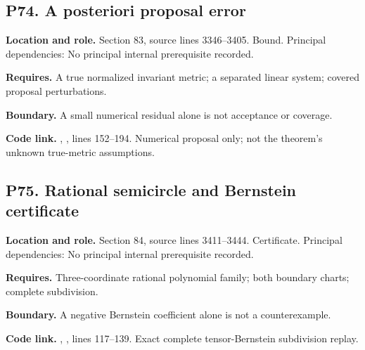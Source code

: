 \documentclass[11pt,oneside,openany]{book}
\numberwithin{equation}{section}
\begin{document}
\par\noindent\begin{minipage}{\textwidth}
\subsection{P74. A posteriori proposal
error}\label{LSMRegister:p74.-a-posteriori-proposal-error}

\textbf{Location and role.} Section 83, source lines 3346--3405. Bound.
Principal dependencies: No principal internal prerequisite recorded.

\textbf{Requires.} A true normalized invariant metric; a separated
linear system; covered proposal perturbations.

\textbf{Boundary.} A small numerical residual alone is not acceptance or
coverage.

\textbf{Code link.} ,
, lines 152--194. Numerical proposal only; not
the theorem's unknown true-metric assumptions.
\end{minipage}\par\medskip

\par\noindent\begin{minipage}{\textwidth}
\subsection{P75. Rational semicircle and Bernstein
certificate}\label{LSMRegister:p75.-rational-semicircle-and-bernstein-certificate}

\textbf{Location and role.} Section 84, source lines 3411--3444.
Certificate. Principal dependencies: No principal internal prerequisite
recorded.

\textbf{Requires.} Three-coordinate rational polynomial family; both
boundary charts; complete subdivision.

\textbf{Boundary.} A negative Bernstein coefficient alone is not a
counterexample.

\textbf{Code link.} ,
, lines 117--139. Exact complete
tensor-Bernstein subdivision replay.
\end{minipage}\par\medskip
\end{document}
